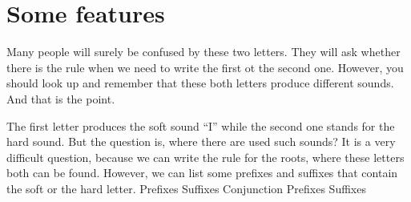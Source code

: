 \section{Some features}

Many people will surely be confused by these two letters. They will ask whether there is the rule when we need to write the first ot the second one. However, you should look up and remember that these both letters produce different sounds. And that is the point. 

The first letter produces the soft sound “I” while the second one stands for the hard sound. But the question is, where there are used such sounds? It is a very difficult question, because we can write the rule for the roots, where these letters both can be found. However, we can list some prefixes and suffixes that contain the soft or the hard letter.
Prefixes 
Suffixes
Conjunction
Prefixes
Suffixes
